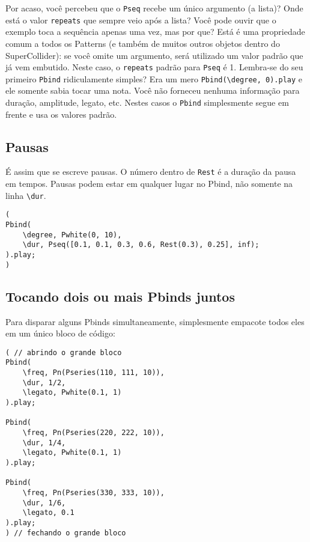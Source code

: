 Por acaso, você percebeu que o \texttt{Pseq} recebe um único argumento (a lista)? Onde está o valor \texttt{repeats} que sempre veio após a lista? Você pode ouvir que o exemplo toca a sequência apenas uma vez, mas por que? Está é uma propriedade comum a todos os Patterns (e também de muitos outros objetos dentro do SuperCollider): se você omite um argumento, será utilizado um valor padrão que já vem embutido. Neste caso, o \texttt{repeats} padrão para \texttt{Pseq} é 1. Lembra-se do seu primeiro \texttt{Pbind} ridiculamente simples? Era um mero \texttt{Pbind(\textbackslash degree, 0).play} e ele somente sabia tocar uma nota. Você não forneceu nenhuma informação para duração, amplitude, legato, etc. Nestes casos o \texttt{Pbind} simplesmente segue em frente e usa os valores padrão.


\subsection{Pausas}

É assim que se escreve pausas. O número dentro de \texttt{Rest} é a duração da pausa em tempos. Pausas podem estar em qualquer lugar no Pbind, não somente na linha \texttt{\textbackslash dur}.

 
\begin{lstlisting}[style=SuperCollider-IDE, basicstyle=\scttfamily\footnotesize]
(
Pbind(
	\degree, Pwhite(0, 10),
	\dur, Pseq([0.1, 0.1, 0.3, 0.6, Rest(0.3), 0.25], inf);
).play;
)
\end{lstlisting}
 

\subsection{Tocando dois ou mais Pbinds juntos}

Para disparar alguns Pbinds simultaneamente, simplesmente empacote todos eles em um único bloco de código:
 
\begin{lstlisting}[style=SuperCollider-IDE, basicstyle=\scttfamily\footnotesize]
( // abrindo o grande bloco
Pbind(
	\freq, Pn(Pseries(110, 111, 10)),
	\dur, 1/2,
	\legato, Pwhite(0.1, 1)
).play;

Pbind(
	\freq, Pn(Pseries(220, 222, 10)),
	\dur, 1/4,
	\legato, Pwhite(0.1, 1)
).play;

Pbind(
	\freq, Pn(Pseries(330, 333, 10)),
	\dur, 1/6,
	\legato, 0.1
).play;
) // fechando o grande bloco
\end{lstlisting}

